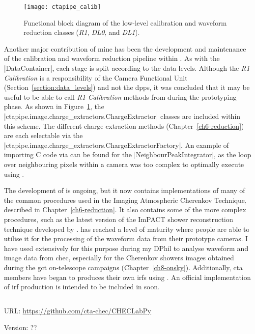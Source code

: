 \begin{figure}[t]
  \centering
  \texttt{[image: ctapipe\_calib]}
  \caption[Functional block diagram of the  low-level calibration classes.]{Functional block diagram of the  low-level calibration and waveform reduction classes (\textit{R1}, \textit{DL0}, and \textit{DL1}).}
  \label{fig:ctapipe_calib}
\end{figure}

Another major contribution of mine has been the development and maintenance of the calibration and waveform reduction pipeline within . As with the |DataContainer|, each stage is split according to the data levels. Although the \textit{R1 Calibration} is a responsibility of the Camera Functional Unit (Section~\ref{section:data_levels}) and not the \gls{dpps}, it was concluded that it may be useful to be able to call \textit{R1 Calibration} methods from  during the prototyping phase. As shown in Figure~\ref{fig:ctapipe_calib}, the |ctapipe.image.charge_extractors.ChargeExtractor| classes are included within this scheme. The different charge extraction methods (Chapter~\ref{ch6-reduction}) are each selectable via the |ctapipe.image.charge_extractors.ChargeExtractorFactory|. An example of importing C code via  can be found for the |NeighbourPeakIntegrator|, as the loop over neighbouring pixels within a camera was too complex to optimally execute using .

The development of  is ongoing, but it now contains implementations of many of the common procedures used in the Imaging Atmospheric Cherenkov Technique, described in Chapter~\ref{ch6-reduction}. It also contains some of the more complex procedures, such as the latest version of the ImPACT shower reconstruction technique developed by \cite{Parsons2014}.  has reached a level of maturity where people are able to utilise it for the processing of the waveform data from their prototype cameras. I have used  extensively for this purpose during my DPhil to analyse waveform and image data from \gls{chec}, especially for the Cherenkov showers images obtained during the \gls{gct} on-telescope campaigns (Chapter~\ref{ch8-onsky}). Additionally, \gls{cta} members have began to produces their own \glspl{irf} using . An official implementation of \gls{irf} production is intended to be included in  soon.

\subsection{}
\vspace{-0.7em}
\noindent \hspace{\parindent} {\tiny URL: \url{https://github.com/cta-chec/CHECLabPy} \par}
\noindent \hspace{\parindent} {\tiny Version: ?? \par}

